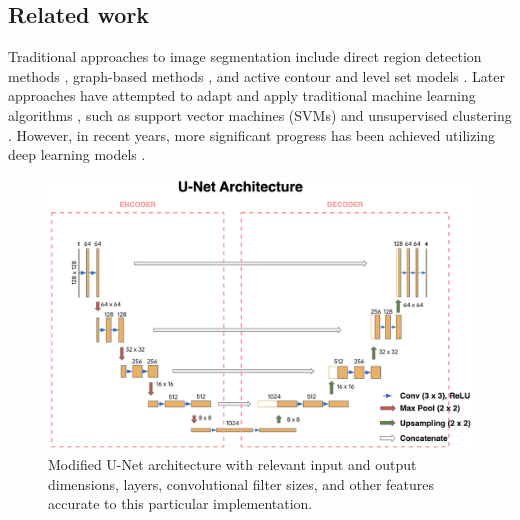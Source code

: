 \documentclass{article}
\begin{document}
\begin{multicols}{2}
\section{Related work}
	
Traditional approaches to image segmentation include direct region detection methods \cite{rundo2016}, graph-based methods \cite{graphchen2018}, and active contour and level set models \cite{contourkhadidos2017}. Later approaches have attempted to adapt and apply traditional machine learning algorithms \cite{machinelearningrundo2020}, such as support vector machines (SVMs) \cite{svmswang2012} and unsupervised clustering \cite{clusteringren2019}. However, in recent years, more significant progress has been achieved utilizing deep learning models \cite{deepker2018} \cite{deeprueckert2020} \cite{deepcastiglioni2021}.

\begin{figure}
\centering
\includegraphics[width=0.85\linewidth]{paper_resources/u-net architecture.png}
\caption{\label{fig:u-net}Modified U-Net architecture with relevant input and output dimensions, layers, convolutional filter sizes, and other features accurate to this particular implementation.}
\end{figure}


\end{multicols}
\end{document}
